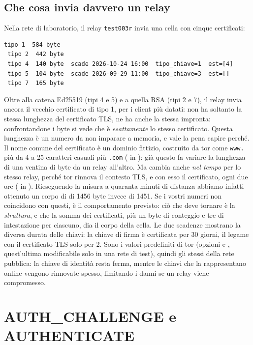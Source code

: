 \subsection{Che cosa invia davvero un relay}

Nella rete di laboratorio, il relay \texttt{test003r} invia una cella  con cinque certificati:
\begin{lstlisting}[numbers=none]
 tipo 1  584 byte
 tipo 2  442 byte
 tipo 4  140 byte  scade 2026-10-24 16:00  tipo_chiave=1  est=[4]
 tipo 5  104 byte  scade 2026-09-29 11:00  tipo_chiave=3  est=[]
 tipo 7  165 byte
\end{lstlisting}
Oltre alla catena Ed25519 (tipi 4 e 5) e a quella RSA (tipi 2 e 7), il relay invia ancora il vecchio certificato di tipo 1, per i client più datati: non ha soltanto la stessa lunghezza del certificato TLS, ne ha anche la stessa impronta: confrontandone i byte si vede che è \emph{esattamente} lo stesso certificato. Questa lunghezza è un numero da non imparare a memoria, e vale la pena capire perché. Il nome comune del certificato è un dominio fittizio, costruito da tor come \texttt{www.} più da 4 a 25 caratteri casuali più \texttt{.com} ( in ): già questo fa variare la lunghezza di una ventina di byte da un relay all'altro. Ma cambia anche \emph{nel tempo} per lo stesso relay, perché tor rinnova il contesto TLS, e con esso il certificato, ogni due ore ( in ). Rieseguendo la misura a quaranta minuti di distanza abbiamo infatti ottenuto un corpo di  di 1456 byte invece di 1451. Se i vostri numeri non coincidono con questi, è il comportamento previsto: ciò che deve tornare è la \emph{struttura}, e che la somma dei certificati, più un byte di conteggio e tre di intestazione per ciascuno, dia il corpo della cella. Le due scadenze mostrano la diversa durata delle chiavi: la chiave di firma è certificata per 30 giorni, il legame con il certificato TLS solo per 2. Sono i valori predefiniti di tor (opzioni  e , quest'ultima modificabile solo in una rete di test), quindi gli stessi della rete pubblica: la chiave di identità resta ferma, mentre le chiavi che la rappresentano online vengono rinnovate spesso, limitando i danni se un relay viene compromesso.

\section{AUTH\_CHALLENGE e AUTHENTICATE}\label{sec:canale-authenticate}

